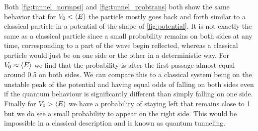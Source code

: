 Both \autoref{fig:tunnel_normpsi} and \autoref{fig:tunnel_probtrans} both show the same behavior that for $V_0<\langle E \rangle$ the particle mostly goes back and forth similar to a classical particle in a potential of the shape of \autoref{fig:potential}. It is not exactly the same as a classical particle since a small probability remains on both sides at any time, corresponding to a part of the wave begin reflected, whereas a classical particle would just be on one side or the other in a deterministic way. For $V_0 \approx \langle E \rangle$ we find that the probability is after the first passage almost equal around 0.5 on both sides. We can compare this to a classical system being on the unstable peak of the potential and having equal odds of falling on both sides even if the quantum behaviour is significantly different than simply falling on one side. Finally for $V_0>\langle E \rangle$ we have a probability of staying left that remains close to 1 but we do see a small probability to appear on the right side. This would be impossible in a classical description and is known as quantum tunneling.

